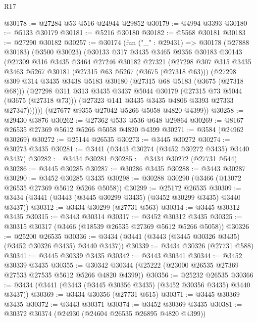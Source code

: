 \begin{lexlean}{R17}
\begin{coremodule}
@30178 := @27284 @53 @516 @24944 @29852
@30179 := @4994 @3393
@30180 := @5133 @30179
@30181 := @5216 @30180
@30182 := @5568 @30181
@30183 := @27290 @30182
@30257 := @30174
    (fun ("_" : @29431) =>
    @30178
      (@27888 @30183)
      (@3500 @30023)
      (@30133
        @317
        @3435
        @3465
        @9356
        @30183
        @30143
        (@27309
          @316
          @3435
          @3464
          @27246
          @30182
          @27321
          (@27298
            @307
            @315
            @3435
            @3463
            @5267
            @30181
            (@27315 @63 @5267 (@3675 (@27318 @63)))
            (@27298
              @309
              @314
              @3435
              @3438
              @5183
              @30180
              (@27315 @68 @5183 (@3675 (@27318 @68)))
              (@27298
                @311
                @313
                @3435
                @3437
                @5044
                @30179
                (@27315 @73 @5044 (@3675 (@27318 @73)))
                (@27323 @141 @3435 @3435 @4806 @3393 @27333 @27347))))))
      (@27677 @9355 @27042 @5266 @5058 @4820 @4399))
@30258 := @29430 @3876
@30262 := @27362 @533 @536 @648 @29864
@30269 := @8167 @26535 @27369 @5612 @5266 @5058 @4820 @4399
@30271 := @3584 (@24962 @30269)
@30272 := @25144 @26535
@30273 := @3445 @30272
@30274 := @30273 @3435
@30281 := @3441 (@3443 @30274 (@3452 @30272 @3435) @3440 @3437)
@30282 := @3434 @30281
@30285 := @3434 @30272 (@27731 @544)
@30286 := @3445 @30285
@30287 := @30286 @3435
@30288 := @3443 @30287
@30290 := @3452 @30285 @3435
@30298 := @30288 @30290 (@3466 (@13072 @26535 @27369 @5612 @5266 @5058))
@30299 := @25172 @26535
@30309 := @3434 (@3441 (@3443 (@3445 @30299 @3435) (@3452 @30299 @3435) @3440 @3437))
@30312 := @3434 @30299 (@27731 @563)
@30314 := @3445 @30312 @3435
@30315 := @3443 @30314
@30317 := @3452 @30312 @3435
@30325 := @30315 @30317 (@3466 (@18539 @26535 @27369 @5612 @5266 @5058))
@30326 := @25200 @26535
@30336 := @3434 (@3441 (@3443 (@3445 @30326 @3435) (@3452 @30326 @3435) @3440 @3437))
@30339 := @3434 @30326 (@27731 @588)
@30341 := @3445 @30339 @3435
@30342 := @3443 @30341
@30344 := @3452 @30339 @3435
@30355 := @30342 @30344 (@25222 (@23000 @26535 @27369 @27533 @27535 @5612 @5266 @4820 @4399))
@30356 := @25232 @26535
@30366 := @3434 (@3441 (@3443 (@3445 @30356 @3435) (@3452 @30356 @3435) @3440 @3437))
@30369 := @3434 @30356 (@27731 @615)
@30371 := @3445 @30369 @3435
@30372 := @3443 @30371
@30374 := @3452 @30369 @3435
@30381 := @30372 @30374 (@24930 (@24604 @26535 @26895 @4820 @4399))

\end{coremodule}
\end{lexlean}
